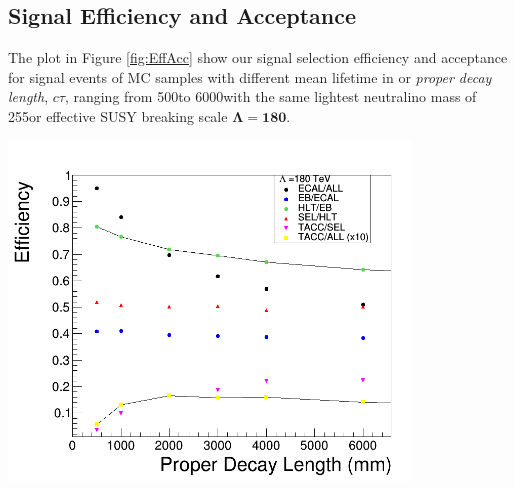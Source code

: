 \subsection{Signal Efficiency and Acceptance}
The plot in Figure \ref{fig:EffAcc} show our signal selection efficiency and acceptance for signal events of MC samples with different mean lifetime in \mm or \textit{proper decay length}, $c\tau$, ranging from 500\mm to 6000\mm with the same lightest neutralino mass of 255\GeVcc or effective SUSY breaking scale $\mathbf{\Lambda=180}$\TeV. 

\vspace{5mm}
\begin{minipage}{0.90\linewidth} 
\begin{center}
\includegraphics[height=0.65\textwidth, width=0.8\textwidth]{THESISPLOTS/Eff_180_ctau_2015.png}
\label{fig:EffAcc}
\end{center}
\end{minipage}

